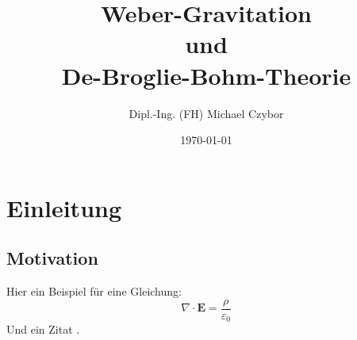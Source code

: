 \documentclass[11pt, a4paper, twoside, openright]{book}
\theoremstyle{definition}
\theoremstyle{plain}
\theoremstyle{remark}
\begin{document}
\frontmatter
\title{Weber-Gravitation\\und\\De-Broglie-Bohm-Theorie}
\author{Dipl.-Ing. (FH) Michael Czybor}
\date{\today}
\maketitle

\tableofcontents

\mainmatter
\chapter{Einleitung}
\section{Motivation}
Hier ein Beispiel für eine Gleichung:
\begin{equation}
    \nabla \cdot \bm{E} = \frac{\rho}{\varepsilon_0}
\end{equation}
Und ein Zitat \parencite{einstein1915}.

\backmatter
\printbibliography[title=Literaturverzeichnis]
\printglossaries
\end{document}
